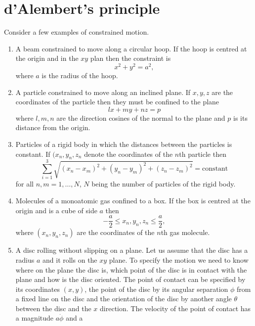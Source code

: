 \section{d'Alembert's principle}\label{c1s2}
Consider a few examples of constrained motion.
\begin{enumerate}
\item A beam constrained to move along a circular hoop. If the hoop is centred
at the origin and in the $xy$ plan then the constraint is
\begin{equation}\label{c1s2e1}
x^2 + y^2 = a^2,
\end{equation}
where $a$ is the radius of the hoop.
\item A particle constrained to move along an inclined plane. If $x, y,
z$ are the coordinates of the particle then they must be confined to
the plane 
\begin{equation}\label{c1s2e2}
lx + my + nz = p
\end{equation}
where $l, m, n$ are the direction cosines of the normal to the plane
and $p$ is its distance from the origin.
\item Particles of a rigid body in which the distances between the particles
is constant. If $(x_n, y_n, z_n$ denote the coordinates of the $n$th particle 
then
\begin{equation}\label{c1s2e3}
\sum_{i=1}^3\sqrt{(x_n-x_m)^2 + (y_n-y_m)^2 + (z_n-z_m)^2} = \text{constant}
\end{equation}
for all $n, m = 1, \ldots, N$, $N$ being the number of particles of the rigid
body.
\item Molecules of a monoatomic gas confined to a box. If the box is centred
at the origin and is a cube of side $a$ then
\begin{equation}\label{c1s2e4}
-\frac{a}{2} \le x_n, y_n, z_n \le \frac{a}{2},
\end{equation}
where $(x_n, y_n, z_n)$ are the coordinates of the $n$th gas molecule.
\item A disc rolling without slipping on a plane. Let us assume that the disc
has a radius $a$ and it rolls on the $xy$ plane. To specify the motion we 
need to know where on the plane the disc is, which point of the disc is in 
contact with the plane and how is the disc oriented. The point of contact can 
be specified by its coordinates $(x, y)$, the point of the disc by its 
angular separation $\phi$ from a fixed line on the disc and the orientation 
of the disc by another angle $\theta$ between the disc and the $x$ direction.
The velocity of the point of contact has a magnitude $a\dot{\phi}$ and a 

\end{enumerate}
